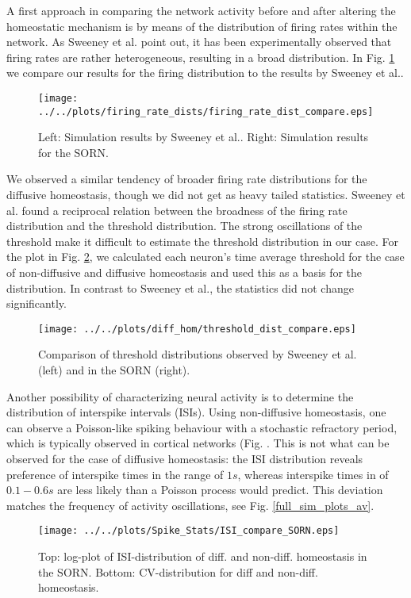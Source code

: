 \documentclass[10pt,a4paper]{article}
\begin{document}
A first approach in comparing the network activity before and after altering the homeostatic mechanism is by means of the distribution of firing rates within the network. As Sweeney et al. point out, it has been experimentally observed that firing rates are rather heterogeneous, resulting in a broad distribution. In Fig. \ref{firing_rate_dist_comp} we compare our results for the firing distribution to the results by Sweeney et al.. 
\begin{figure}
\texttt{[image: ../../plots/firing\_rate\_dists/firing\_rate\_dist\_compare.eps]}
\caption{Left: Simulation results by Sweeney et al.. Right: Simulation results for the SORN.}
\label{firing_rate_dist_comp}
\end{figure}
We observed a similar tendency of broader firing rate distributions for the diffusive homeostasis, though we did not get as heavy tailed statistics. Sweeney et al. found a reciprocal relation between the broadness of the firing rate distribution and the threshold distribution. The strong oscillations of the threshold make it difficult to estimate the threshold distribution in our case. For the plot in Fig. \ref{thresh_dist_comp}, we calculated each neuron's time average threshold for the case of non-diffusive and diffusive homeostasis and used this as a basis for the distribution. In contrast to Sweeney et al., the statistics did not change significantly.
\begin{figure}
\texttt{[image: ../../plots/diff\_hom/threshold\_dist\_compare.eps]}
\caption{Comparison of threshold distributions observed by Sweeney et al. (left) and in the SORN (right).}
\label{thresh_dist_comp}
\end{figure}



Another possibility of characterizing neural activity is to determine the distribution of interspike intervals (ISIs). Using non-diffusive homeostasis, one can observe a Poisson-like spiking behaviour with a stochastic refractory period, which is typically observed in cortical networks (Fig. . This is not what can be observed for the case of diffusive homeostasis: the ISI distribution reveals preference of interspike times in the range of $1s$, whereas interspike times in of $0.1-0.6s$ are less likely than a Poisson process would predict. This deviation matches the frequency of activity oscillations, see Fig. \ref{full_sim_plots_av}.
\begin{figure}
\texttt{[image: ../../plots/Spike\_Stats/ISI\_compare\_SORN.eps]}
\caption{Top: log-plot of ISI-distribution of diff. and non-diff. homeostasis in the SORN. Bottom: CV-distribution for diff and non-diff. homeostasis.}
\label{ISI_compare}
\end{figure}
\end{document}
